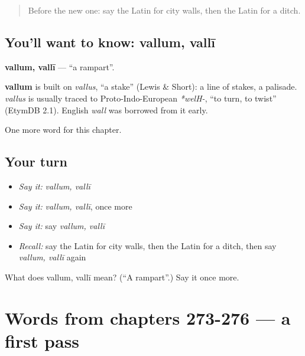 \label{lesson:LA-C280-vallum}



\begin{quote}
Before the new one: say the Latin for city walls, then the Latin for a ditch.
\end{quote}

\subsection*{You'll want to know: vallum, vallī}
\textbf{vallum, vallī} — \textquotedblleft{}a rampart\textquotedblright{}.

\begin{cousinweb}
\textbf{vallum} is built on \emph{vallus}, \textquotedblleft{}a stake\textquotedblright{} (Lewis \& Short): a line of stakes, a palisade. \emph{vallus} is usually traced to Proto-Indo-European \emph{*welH-}, \textquotedblleft{}to turn, to twist\textquotedblright{} (EtymDB 2.1). English \emph{wall} was borrowed from it early.
\end{cousinweb}

\begin{grammarlens}[title={What you've built}]
One more word for this chapter.
\end{grammarlens}

\subsection*{Your turn}
\begin{itemize}
\raggedright
  \item \emph{Say it:} \emph{vallum, vallī}
  \item \emph{Say it:} \emph{vallum, vallī}, once more
  \item \emph{Say it:} say \emph{vallum, vallī}
  \item \emph{Recall:} say the Latin for city walls, then the Latin for a ditch, then say \emph{vallum, vallī} again
\end{itemize}

\begin{tcolorbox}[breakable,colback=teal!4,colframe=teal!35!black,title={Before you move on}]
What does vallum, vallī mean? (\textquotedblleft{}A rampart\textquotedblright{}.) Say it once more.
\end{tcolorbox}
\section[(dialogue)]{Words from chapters 273-276 — a first pass}

